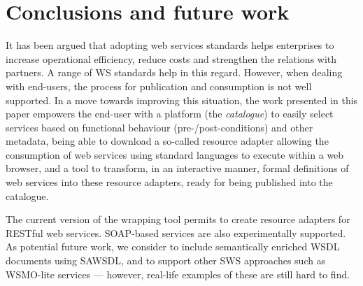 
\section{Conclusions and future work}
\label{sec:conclusions}

It has been argued that adopting web services standards helps enterprises to increase operational efficiency, reduce costs and strengthen the relations with partners. 
A range of WS standards help in this regard.
However, when dealing with end-users, the process for publication and consumption is not well supported. 
In a move towards improving this situation, the work presented in this paper empowers the end-user with a platform (the \emph{catalogue}) to easily select services based on functional behaviour (pre-/post-conditions) and other metadata, being able to download a so-called resource adapter allowing the consumption of web services using standard languages to execute within a web browser, and a tool to transform, in an interactive manner, formal definitions of web services into these resource adapters, ready for being published into the catalogue.

The current version of the wrapping tool permits to create resource adapters for RESTful web services.
SOAP-based services are also experimentally supported. As potential future work, we consider to include semantically enriched WSDL documents using SAWSDL, and to support other SWS approaches such as WSMO-lite services --- however, real-life examples of these are still hard to find.

